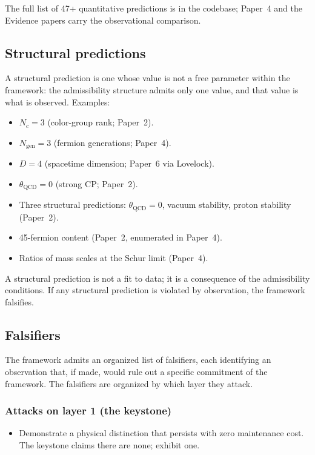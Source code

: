 \documentclass[11pt]{article}
\begin{document}
\noindent The full list of 47+ quantitative predictions is in the codebase; Paper~4 and the Evidence papers carry the observational comparison.

\subsection{Structural predictions}\label{sec:structural_predictions}

A structural prediction is one whose value is not a free parameter within the framework: the admissibility structure admits only one value, and that value is what is observed. Examples:

\begin{itemize}
    \item $N_c = 3$ (color-group rank; Paper~2).
    \item $N_{\mathrm{gen}} = 3$ (fermion generations; Paper~4).
    \item $D = 4$ (spacetime dimension; Paper~6 via Lovelock).
    \item $\theta_{\mathrm{QCD}} = 0$ (strong CP; Paper~2).
    \item Three structural predictions: $\theta_{\mathrm{QCD}} = 0$, vacuum stability, proton stability (Paper~2).
    \item 45-fermion content (Paper~2, enumerated in Paper~4).
    \item Ratios of mass scales at the Schur limit (Paper~4).
\end{itemize}

\noindent A structural prediction is not a fit to data; it is a consequence of the admissibility conditions. If any structural prediction is violated by observation, the framework falsifies.

\subsection{Falsifiers}\label{sec:falsifiers}

The framework admits an organized list of falsifiers, each identifying an observation that, if made, would rule out a specific commitment of the framework. The falsifiers are organized by which layer they attack.

\subsubsection*{Attacks on layer 1 (the keystone)}

\begin{itemize}
    \item Demonstrate a physical distinction that persists with zero maintenance cost. The keystone claims there are none; exhibit one.
\end{itemize}
\end{document}
